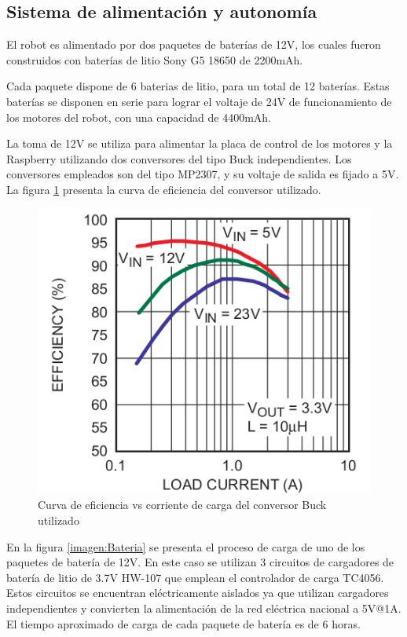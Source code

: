 \subsection{Sistema de alimentación y autonomía}

El robot es alimentado por dos paquetes de baterías de 12V, los cuales fueron construidos con baterías de litio Sony G5 18650 de 2200mAh.

Cada paquete dispone de 6 baterias de litio, para un total de 12 baterías.  Estas baterías se disponen en serie para lograr el voltaje de 24V de funcionamiento de los motores del robot, con una capacidad de 4400mAh. 

La toma de 12V se utiliza para alimentar la placa de control de los motores y la Raspberry utilizando dos conversores del tipo Buck independientes. Los conversores empleados son del tipo MP2307, y su voltaje de salida es fijado a  5V. La figura \ref{imagen:BuckCurva} presenta la curva de eficiencia del conversor utilizado.


\begin{figure}[H]
	\centering	
	\includegraphics[width=0.5\linewidth]{imagenes/prototipo/Buck}
	\caption[Curva de eficiencia de los conversores]{Curva de eficiencia vs corriente de carga del conversor Buck utilizado}
	\label{imagen:BuckCurva}
\end{figure}


En la figura \ref{imagen:Bateria} se presenta el proceso de carga de uno de los paquetes de batería de 12V. En este caso se utilizan 3 circuitos de cargadores de batería de litio de 3.7V HW-107 que emplean el controlador de carga TC4056. Estos circuitos se encuentran eléctricamente aislados ya que utilizan cargadores independientes y convierten la alimentación de la red eléctrica nacional a 5V@1A. El tiempo aproximado de carga de cada paquete de batería es de 6 horas.

